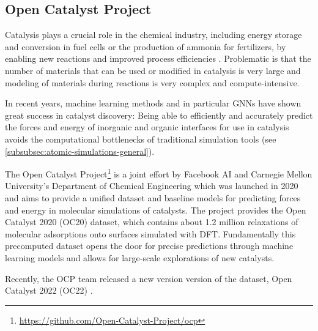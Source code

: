 \subsection{Open Catalyst Project}

Catalysis plays a crucial role in the chemical industry, including energy storage and conversion in 
fuel cells or the production of ammonia for fertilizers, by enabling new reactions and improved 
process efficiencies \cite{Chanussot_2021}. Problematic is that the number of materials that can 
be used or modified in catalysis is very large and modeling of materials during reactions is very 
complex and compute-intensive.

In recent years, machine learning methods and in particular GNNs have shown great success in 
catalyst discovery: Being able to efficiently and accurately predict the 
forces and energy of inorganic and organic interfaces for use in catalysis avoids the 
computational bottlenecks of traditional simulation tools (see \ref{subsubsec:atomic-simulations-general}). 

The Open Catalyst Project\footnote{\url{https://github.com/Open-Catalyst-Project/ocp}} \cite*{Chanussot_2021} is a joint effort by Facebook AI and Carnegie Mellon 
University's Department of Chemical Engineering which was launched in 2020 and 
aims to provide a unified dataset and baseline models for predicting forces and energy in molecular 
simulations of catalysts. The project provides the Open Catalyst 2020 (OC20) dataset, which contains 
about 1.2 million relaxations of molecular adsorptions onto surfaces simulated with DFT. Fundamentally this 
precomputed dataset opens the door for precise predictions through machine learning models and allows
for large-scale explorations of new catalysts.

Recently, the OCP team released a new version version of the dataset, Open Catalyst 2022 (OC22) 
\cite{https://doi.org/10.48550/arxiv.2206.08917}.